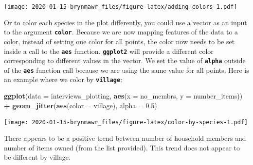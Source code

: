 \documentclass[]{book}
\newenvironment{Shaded}{\begin{snugshade}}{\end{snugshade}}
\newcommand{\KeywordTok}[1]{\textcolor[rgb]{0.13,0.29,0.53}{\textbf{#1}}}
\newcommand{\DataTypeTok}[1]{\textcolor[rgb]{0.13,0.29,0.53}{#1}}
\newcommand{\FloatTok}[1]{\textcolor[rgb]{0.00,0.00,0.81}{#1}}
\newcommand{\StringTok}[1]{\textcolor[rgb]{0.31,0.60,0.02}{#1}}
\newcommand{\OperatorTok}[1]{\textcolor[rgb]{0.81,0.36,0.00}{\textbf{#1}}}
\newcommand{\NormalTok}[1]{#1}
\begin{document}
\texttt{[image: 2020-01-15-brynmawr\_files/figure-latex/adding-colors-1.pdf]}

Or to color each species in the plot differently, you could use a vector
as an input to the argument \textbf{\texttt{color}}. Because we are now
mapping features of the data to a color, instead of setting one color
for all points, the color now needs to be set inside a call to the
\textbf{\texttt{aes}} function. \textbf{\texttt{ggplot2}} will provide a
different color corresponding to different values in the vector. We set
the value of \textbf{\texttt{alpha}} outside of the
\textbf{\texttt{aes}} function call because we are using the same value
for all points. Here is an example where we color by
\textbf{\texttt{village}}:

\begin{Shaded}
\begin{Highlighting}[]
\KeywordTok{ggplot}\NormalTok{(}\DataTypeTok{data =}\NormalTok{ interviews_plotting, }\KeywordTok{aes}\NormalTok{(}\DataTypeTok{x =}\NormalTok{ no_membrs, }\DataTypeTok{y =}\NormalTok{ number_items)) }\OperatorTok{+}
\StringTok{    }\KeywordTok{geom_jitter}\NormalTok{(}\KeywordTok{aes}\NormalTok{(}\DataTypeTok{color =}\NormalTok{ village), }\DataTypeTok{alpha =} \FloatTok{0.5}\NormalTok{)}
\end{Highlighting}
\end{Shaded}

\texttt{[image: 2020-01-15-brynmawr\_files/figure-latex/color-by-species-1.pdf]}

There appears to be a positive trend between number of household members
and number of items owned (from the list provided). This trend does not
appear to be different by village.
\end{document}
